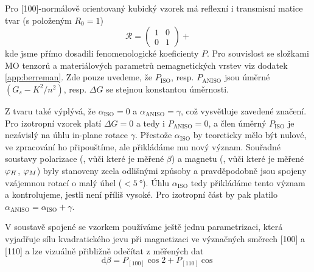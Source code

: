 Pro [100]-normálově orientovaný kubický vzorek má reflexní i transmisní matice tvar (s položeným $R_0=1$)
\begin{equation}
    \mathcal{R} = \begin{pmatrix} 1&0\\0&1 \end{pmatrix} + 
\end{equation}
kde jsme přímo dosadili fenomenologické koeficienty $P$.
Pro souvislost se složkami MO tenzorů a materiálových parametrů nemagnetických vrstev viz dodatek \ref{app:berreman}.
Zde pouze uvedeme, že $P_\textrm{ISO}$, resp. $P_\textrm{ANISO}$ jsou úměrné $(G_s-K^2/n^2)$, resp. $\Delta G$ se stejnou konstantou úměrnosti.

Z tvaru také výplývá, že $\alpha_\textrm{ISO}=0$ a $\alpha_\textrm{ANISO}=\gamma$, což vysvětluje zavedené značení.
Pro izotropní vzorek platí $\Delta G = 0$ a tedy i $P_\textrm{ANISO}=0$, a člen úměrný $P_\textrm{ISO}$ je nezávislý na úhlu in-plane rotace $\gamma$.
Přestože $\alpha_\textrm{ISO}$ by teoreticky mělo být nulové, ve zpracování ho připouštíme, ale přikládáme mu nový význam.
Souřadné soustavy polarizace (, vůči které je měřené $\beta$) a magnetu (, vůči které je měřené $\varphi_H$, $\varphi_M$) byly stanoveny zcela odlišnými způsoby a pravděpodobně jsou spojeny vzájemnou rotací o malý úhel ($<\SI{5}{\degree}$).
Úhlu $\alpha_\textrm{ISO}$ tedy přikládáme tento význam a kontrolujeme, jestli není příliš vysoké.
Pro izotropní část by pak platilo $\alpha_\textrm{ANISO}=\alpha_\textrm{ISO}+\gamma$.

V soustavě spojené se vzorkem používáme ještě jednu parametrizaci, která vyjadřuje sílu kvadratického jevu při magnetizaci ve význačných směrech [100] a [110] a lze vizuálně přibližně odečítat z měřených dat
\begin{equation}
    \textrm{d}\beta = P_{[100]} \cos 2 + P_{[110]} \cos 
\end{equation}


